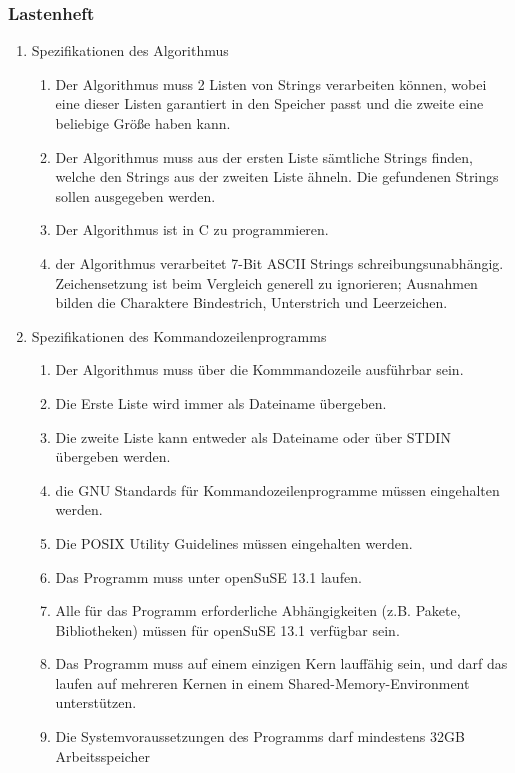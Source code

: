 \subsubsection{Lastenheft}
\renewcommand{\labelenumii}{\theenumii}
\renewcommand{\theenumii}{\theenumi.\arabic{enumii}.}
\label{auszug:lastenheft}
\begin{enumerate}
	\item Spezifikationen des Algorithmus
	\begin{enumerate}
		\item Der Algorithmus muss 2 Listen von Strings verarbeiten können,
		wobei eine dieser Listen garantiert in den Speicher passt und die zweite
		eine beliebige Größe haben kann.
		\item Der Algorithmus muss aus der ersten Liste sämtliche Strings finden,
		welche den Strings aus der zweiten Liste ähneln. Die gefundenen Strings
		sollen ausgegeben werden.
		\item Der Algorithmus ist in C zu programmieren.
		\item der Algorithmus verarbeitet 7-Bit ASCII Strings schreibungsunabhängig. Zeichensetzung
		ist beim Vergleich generell zu ignorieren; Ausnahmen bilden die
		Charaktere Bindestrich, Unterstrich und Leerzeichen.
	\end{enumerate}
	\item Spezifikationen des Kommandozeilenprogramms
	\begin{enumerate}
		\item Der Algorithmus muss über die Kommmandozeile ausführbar sein.
		\item Die Erste Liste wird immer als Dateiname übergeben.
		\item Die zweite Liste kann entweder als Dateiname oder über STDIN übergeben werden.
		\item die GNU Standards für Kommandozeilenprogramme müssen eingehalten werden.
		\item Die POSIX Utility Guidelines müssen eingehalten werden.
		\item Das Programm muss unter openSuSE 13.1 laufen.
		\item Alle für das Programm erforderliche Abhängigkeiten
		(z.B. Pakete, Bibliotheken) müssen für openSuSE 13.1 verfügbar sein.
		\item Das Programm muss auf einem einzigen Kern lauffähig sein, und
		darf das laufen auf mehreren Kernen in einem Shared-Memory-Environment
		unterstützen.
		\item Die Systemvoraussetzungen des Programms darf mindestens 32GB Arbeitsspeicher

\end{enumerate}
\end{enumerate}
